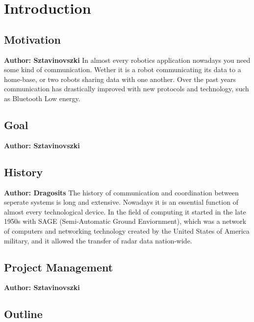 \chapter{Introduction}


\vspace{2mm}

\section{Motivation}
\textbf{Author: Sztavinovszki}
In almost every robotics application nowadays you need some kind of communication. Wether it is a robot communicating
its data to a home-base, or two robots sharing data with one another. Over the past years communication has drastically
improved with new protocols and technology, such as Bluetooth Low energy.

\section{Goal}
\textbf{Author: Sztavinovszki}

\section{History}
\textbf{Author: Dragosits}
The history of communication and coordination between seperate systems is long and extensive. Nowadays it is an essential 
function of almost every technological device. In the field of computing it started in the late 1950s with SAGE (Semi-Automatic Ground Enviornment),
which was a network of computers and networking technology created by the United States of America military, 
and it allowed the transfer of radar data nation-wide.

\section{Project Management}
\textbf{Author: Sztavinovszki}

\section{Outline}

